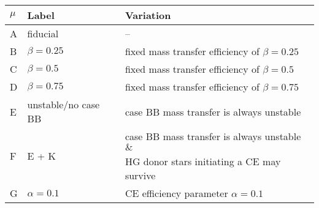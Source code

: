 



\begin{table}
%
\centering
\begin{tabular}{|l|l|l|}
\hline \hline
$\mu$ & Label  & Variation \\ \hline \hline 
%
A      & fiducial		& --        	     	\\%
%
%
\hline
%
B     & $\beta =0.25$  		                 				& fixed mass transfer efficiency of $\beta=0.25$ \\%
%
C       & $\beta =0.5$  	                				& fixed mass transfer efficiency of $\beta=0.5$\\%
%
D        & $\beta =0.75$ 		                 				& fixed mass transfer efficiency of $\beta=0.75$  \\%
%
E       & unstable/no case BB		& case BB mass transfer is always unstable\\%
%
\multirow{2}{*}{F}       & \multirow{2}{*}{ E + K } & case BB mass transfer is always unstable $\&$  \\%
 & 	  &   HG donor stars initiating a CE may survive \\
%
\hline
%
G       &$\alpha=0.1$	                   				&  CE efficiency parameter $\alpha = 0.1$ \\%


\end{tabular}
\end{table}
